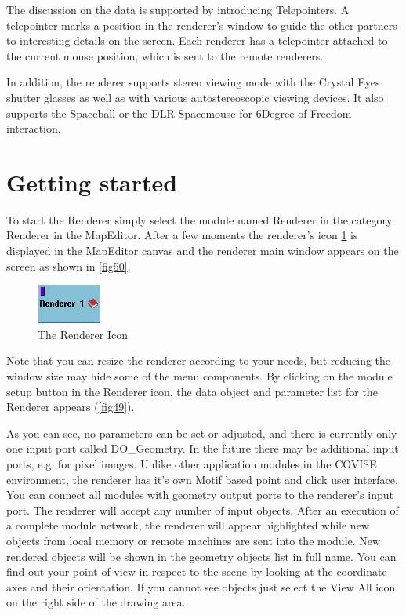The discussion on the data is supported by introducing Telepointers. A telepointer
marks a position in the renderer's window to guide the other partners to interesting
details on the screen. Each renderer has a telepointer attached to the current
mouse position, which is sent to the remote renderers.

In addition, the renderer supports stereo viewing mode with the Crystal Eyes
shutter glasses as well as with various autostereoscopic viewing devices.
It also supports the Spaceball or the DLR Spacemouse for 6Degree of Freedom interaction.

\section{Getting started}
To start the Renderer simply select the module named Renderer in
the category Renderer in the MapEditor. After a few moments the renderer's icon \ref{fig48}
is displayed in the MapEditor canvas and the renderer main window appears on the
screen as shown in \ref{fig50}.

 \latexonly
 \begin{figure}[htp]
  \begin{center}
   \includegraphics[scale=0.7]{renderer/pict/image1}
   \caption{The Renderer Icon}
	\label{fig48}
  \end{center}
 \end{figure}
 \endlatexonly

Note that you can resize the renderer according to your needs, but reducing the
window size may hide some of the menu components. By clicking on the module setup
button in the Renderer icon, the data object and parameter list for the Renderer
appears (\ref{fig49}).

As you can see, no parameters can be set or adjusted, and there is currently only
one input port called DO\_Geometry. In the future there may be additional input
ports, e.g. for pixel images. Unlike other application modules in the COVISE
environment, the renderer has it's own Motif based point and click user interface.
You can connect all modules with geometry output ports to the renderer's input
port. The renderer will accept any number of input objects. After an execution
of a complete module network, the renderer will appear highlighted while new
objects from local memory or remote machines are sent into the module. New
rendered objects will be shown in the geometry objects list in full name. You
can find out your point of view in respect to the scene by looking at the
coordinate axes and their orientation. If you cannot see objects just select
the View All icon on the right side of the drawing area. 

